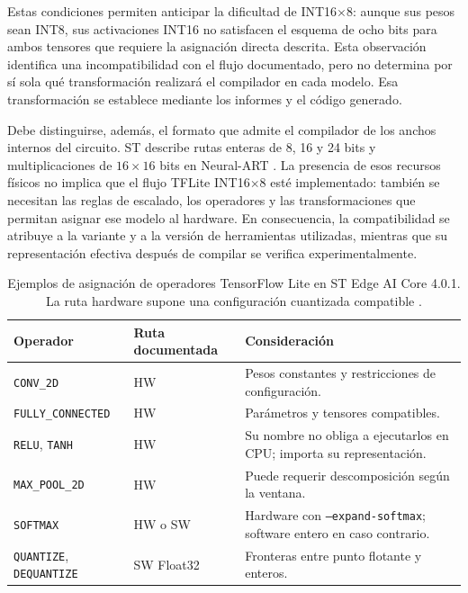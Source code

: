 Estas condiciones permiten anticipar la dificultad de INT16$\times$8: aunque sus pesos sean INT8, sus activaciones INT16 no satisfacen el esquema de ocho bits para ambos tensores que requiere la asignación directa descrita. Esta observación identifica una incompatibilidad con el flujo documentado, pero no determina por sí sola qué transformación realizará el compilador en cada modelo. Esa transformación se establece mediante los informes y el código generado.

Debe distinguirse, además, el formato que admite el compilador de los anchos internos del circuito. ST describe rutas enteras de 8, 16 y 24 bits y multiplicaciones de $16\times16$ bits en Neural-ART \cite{cap4_stconcepts}. La presencia de esos recursos físicos no implica que el flujo TFLite INT16$\times$8 esté implementado: también se necesitan las reglas de escalado, los operadores y las transformaciones que permitan asignar ese modelo al hardware. En consecuencia, la compatibilidad se atribuye a la variante y a la versión de herramientas utilizadas, mientras que su representación efectiva después de compilar se verifica experimentalmente.

\begin{table}[H]\centering\small
\caption{Ejemplos de asignación de operadores TensorFlow Lite en ST Edge AI Core 4.0.1. La ruta hardware supone una configuración cuantizada compatible \cite{cap4_stoperators}.}\label{tab:cap4_operadores}
\begin{tabularx}{\linewidth}{p{3.5cm}lY}\toprule
Operador & Ruta documentada & Consideración\\\midrule
\texttt{CONV\_\allowbreak 2D} & HW & Pesos constantes y restricciones de configuración.\\
\texttt{FULLY\_\allowbreak CONNECTED} & HW & Parámetros y tensores compatibles.\\
\texttt{RELU}, \texttt{TANH} & HW & Su nombre no obliga a ejecutarlos en CPU; importa su representación.\\
\texttt{MAX\_\allowbreak POOL\_\allowbreak 2D} & HW & Puede requerir descomposición según la ventana.\\
\texttt{SOFTMAX} & HW o SW & Hardware con \texttt{--expand-softmax}; software entero en caso contrario.\\
\texttt{QUANTIZE}, \texttt{DEQUANTIZE} & SW Float32 & Fronteras entre punto flotante y enteros.\\\bottomrule
\end{tabularx}
\end{table}

